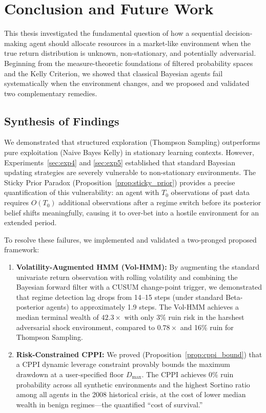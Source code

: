 \chapter{Conclusion and Future Work}
\label{ch:conclusion}

This thesis investigated the fundamental question of how a sequential
decision-making agent should allocate resources in a market-like environment
when the true return distribution is unknown, non-stationary, and potentially
adversarial.  Beginning from the measure-theoretic foundations of
filtered probability spaces and the Kelly Criterion, we showed that classical
Bayesian agents fail systematically when the environment changes, and we
proposed and validated two complementary remedies.

\section{Synthesis of Findings}

We demonstrated that structured exploration (Thompson Sampling) outperforms
pure exploitation (Naive Bayes Kelly) in stationary learning contexts.
However, Experiments~\ref{sec:exp4} and \ref{sec:exp5} established that
standard Bayesian updating strategies are severely vulnerable to
non-stationary environments.  The Sticky Prior Paradox
(Proposition~\ref{prop:sticky_prior}) provides a precise quantification of
this vulnerability: an agent with $T_0$ observations of past data requires
$O(T_0)$ additional observations after a regime switch before its posterior
belief shifts meaningfully, causing it to over-bet into a hostile environment
for an extended period.

To resolve these failures, we implemented and validated a two-pronged
proposed framework:

\begin{enumerate}
    \item \textbf{Volatility-Augmented HMM (Vol-HMM):} By augmenting the
    standard univariate return observation with rolling volatility and
    combining the Bayesian forward filter with a CUSUM change-point trigger,
    we demonstrated that regime detection lag drops from 14--15 steps (under
    standard Beta-posterior agents) to approximately 1.9 steps.  The
    Vol-HMM achieves a median terminal wealth of $42.3\times$ with only 3\%
    ruin risk in the harshest adversarial shock environment, compared to
    $0.78\times$ and 16\% ruin for Thompson Sampling.

    \item \textbf{Risk-Constrained CPPI:} We proved
    (Proposition~\ref{prop:cppi_bound}) that a CPPI dynamic leverage
    constraint provably bounds the maximum drawdown at a user-specified
    floor $D_{\max}$.  The CPPI achieves 0\% ruin probability across all
    synthetic environments and the highest Sortino ratio among all agents in
    the 2008 historical crisis, at the cost of lower median wealth in benign
    regimes---the quantified ``cost of survival.''
\end{enumerate}

